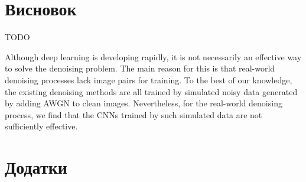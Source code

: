 \documentclass[14pt,a4paper]{extarticle}
\newcounter{e}
\newcounter{tabl}
\numberwithin{equation}{section}
\numberwithin{figure}{section}
\newcommand{\tabboxc}[2]{\parbox{#1}{\vspace{-0.3cm}
		\begin{center} #2 \end{center} \vspace{-0.3cm} }}
\begin{document}
	

	
	\newpage
	\thispagestyle{empty}
	\section*{Висновок}
	TODO
	
	Although deep learning is developing rapidly, it is not necessarily an effective way to solve the denoising problem. The main reason for this is that real-world denoising processes lack image pairs for training. To the best of our knowledge, the existing denoising methods are all trained by simulated noisy data generated by adding AWGN to clean images. Nevertheless, for the real-world denoising process, we find that the CNNs trained by such simulated data are not sufficiently effective.
	
	
	\newpage
	\thispagestyle{empty}
	\section*{Додатки}
	
\end{document}
